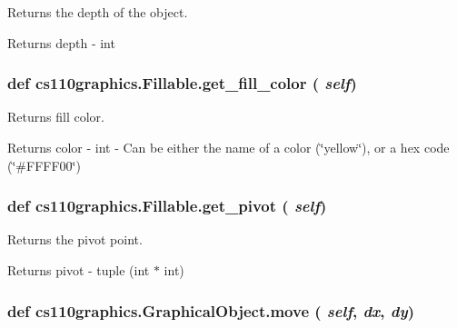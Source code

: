 Returns the depth of the object. \begin{DoxyReturn}{Returns}
depth -\/ int 
\end{DoxyReturn}
\hypertarget{classcs110graphics_1_1Fillable_a16c045bc9b63961b696914ee1a1d14d9}{
\subsubsection[{get\_\-fill\_\-color}]{\setlength{\rightskip}{0pt plus 5cm}def cs110graphics.Fillable.get\_\-fill\_\-color ( {\em self})}}
\label{classcs110graphics_1_1Fillable_a16c045bc9b63961b696914ee1a1d14d9}


Returns fill color. \begin{DoxyReturn}{Returns}
color -\/ int -\/ Can be either the name of a color (\char`\"{}yellow\char`\"{}), or a hex code (\char`\"{}\#FFFF00\char`\"{}) 
\end{DoxyReturn}
\hypertarget{classcs110graphics_1_1Fillable_a514fa0d21297c1372681afae9219fd58}{
\subsubsection[{get\_\-pivot}]{\setlength{\rightskip}{0pt plus 5cm}def cs110graphics.Fillable.get\_\-pivot ( {\em self})}}
\label{classcs110graphics_1_1Fillable_a514fa0d21297c1372681afae9219fd58}


Returns the pivot point. \begin{DoxyReturn}{Returns}
pivot -\/ tuple (int $\ast$ int) 
\end{DoxyReturn}
\hypertarget{classcs110graphics_1_1GraphicalObject_aa64d270fb83efa4a54e1a7953512f9cd}{
\subsubsection[{move}]{\setlength{\rightskip}{0pt plus 5cm}def cs110graphics.GraphicalObject.move ( {\em self}, \/   {\em dx}, \/   {\em dy})}}
\label{classcs110graphics_1_1GraphicalObject_aa64d270fb83efa4a54e1a7953512f9cd}


